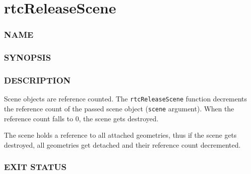 \pagebreak

\section{rtcReleaseScene}\label{rtcreleasescene}

\subsubsection{NAME}\label{name}

\begin{Shaded}
\begin{Highlighting}[]
\OperatorTok{{-}}
\end{Highlighting}
\end{Shaded}

\subsubsection{SYNOPSIS}\label{synopsis}

\begin{Shaded}
\begin{Highlighting}[]

\OperatorTok{(}\OperatorTok{);}
\end{Highlighting}
\end{Shaded}

\subsubsection{DESCRIPTION}\label{description}

Scene objects are reference counted. The \texttt{rtcReleaseScene}
function decrements the reference count of the passed scene object
(\texttt{scene} argument). When the reference count falls to 0, the
scene gets destroyed.

The scene holds a reference to all attached geometries, thus if the
scene gets destroyed, all geometries get detached and their reference
count decremented.

\subsubsection{EXIT STATUS}\label{exit-status}

